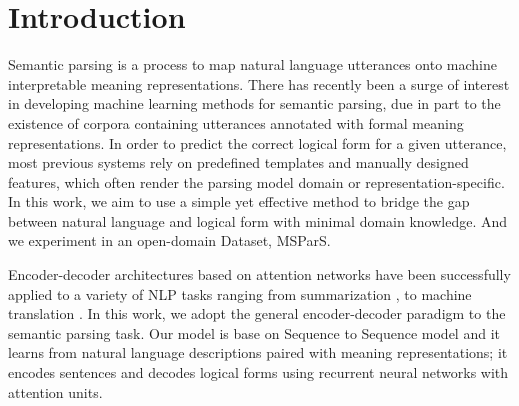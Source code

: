 \section{Introduction}

Semantic parsing is a process to map natural language utterances onto machine interpretable meaning representations. There has recently been a surge of interest in developing machine learning methods for semantic parsing, due in part to the existence of corpora containing utterances annotated with formal meaning representations. In order to predict the correct logical form for a given utterance, most previous systems rely on predefined templates and manually designed features, which often render the parsing model domain or representation-specific. In this work, we aim to use a simple yet effective method to bridge the gap between natural language and logical form with minimal domain knowledge. And we experiment in an open-domain Dataset, MSParS.\cite{MSParS}

Encoder-decoder architectures based on attention networks have been successfully applied to a variety of NLP tasks ranging from summarization \cite{gehring2017convolutional, narayan2018don} , to machine translation \cite{klein2017opennmt}. In this work, we adopt the general encoder-decoder paradigm to the semantic parsing task. Our model is base on Sequence to Sequence model \cite{sutskever2014sequence} and it learns from natural language descriptions paired with meaning representations; it encodes sentences and decodes logical forms using recurrent neural networks with attention units.

